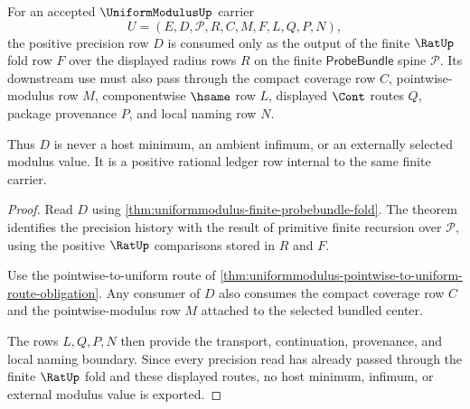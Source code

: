 \begin{theorem}
\label{thm:uniformmodulus-positive-precision-ledger-obligation}
For an accepted $\UniformModulusUp$ carrier
$$
U=(E,D,\mathcal{P},R,C,M,F,L,Q,P,N),
$$
the positive precision row $D$ is consumed only as the output of the finite $\RatUp$ fold row $F$ over the displayed radius rows $R$ on the finite $\mathsf{ProbeBundle}$ spine $\mathcal{P}$. Its downstream use must also pass through the compact coverage row $C$, pointwise-modulus row $M$, componentwise $\hsame$ row $L$, displayed $\Cont$ routes $Q$, package provenance $P$, and local naming row $N$.

Thus $D$ is never a host minimum, an ambient infimum, or an externally selected modulus value. It is a positive rational ledger row internal to the same finite carrier.
\end{theorem}
\begin{proof}
Read $D$ using \autoref{thm:uniformmodulus-finite-probebundle-fold}. The theorem identifies the precision history with the result of primitive finite recursion over $\mathcal{P}$, using the positive $\RatUp$ comparisons stored in $R$ and $F$.

Use the pointwise-to-uniform route of \autoref{thm:uniformmodulus-pointwise-to-uniform-route-obligation}. Any consumer of $D$ also consumes the compact coverage row $C$ and the pointwise-modulus row $M$ attached to the selected bundled center.

The rows $L,Q,P,N$ then provide the transport, continuation, provenance, and local naming boundary. Since every precision read has already passed through the finite $\RatUp$ fold and these displayed routes, no host minimum, infimum, or external modulus value is exported.
\end{proof}

